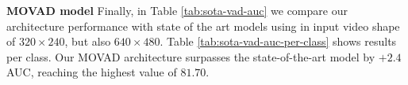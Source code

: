 \noindent\textbf{MOVAD model}
Finally, in Table \ref{tab:sota-vad-auc} we compare our architecture performance with state of the art models using in input video shape of $320\times240$, but also $640\times480$.
Table \ref{tab:sota-vad-auc-per-class} shows results per class.
Our MOVAD architecture surpasses the state-of-the-art model by $+2.4$ AUC, reaching the highest value of $81.70$.

